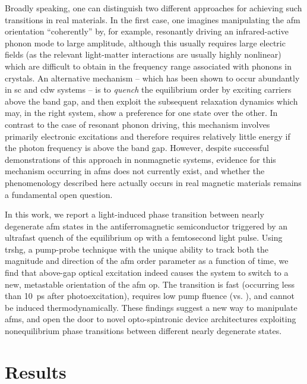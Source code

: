 Broadly speaking, one can distinguish two different approaches for achieving such transitions in real materials.
In the first case, one imagines manipulating the \gls{afm} orientation ``coherently'' by, for example, resonantly driving an infrared-active phonon mode to large amplitude, although this usually requires large electric fields (as the relevant light-matter interactions are usually highly nonlinear\citep{afanasiev_ultrafast_2021}) which are difficult to obtain in the frequency range associated with phonons in crystals.
An alternative mechanism -- which has been shown to occur abundantly in \gls{sc}\citep{fausti_light-induced_2011} and \gls{cdw}\citep{kogar_light-induced_2020} systems -- is to \textit{quench} the equilibrium order by exciting carriers above the band gap, and then exploit the subsequent relaxation dynamics which may, in the right system, show a preference for one state over the other\citep{sun_transient_2020}.
In contrast to the case of resonant phonon driving, this mechanism involves primarily electronic excitations and therefore requires relatively little energy if the photon frequency is above the band gap.
However, despite successful demonstrations of this approach in nonmagnetic systems\citep{fausti_light-induced_2011,kogar_light-induced_2020}, evidence for this mechanism occurring in \glspl{afm} does not currently exist, and whether the phenomenology described here actually occurs in real magnetic materials remains a fundamental open question.

In this work, we report a light-induced phase transition between nearly degenerate \gls{afm} states in the antiferromagnetic semiconductor \cmb \citep{gibson_magnetic_2015} triggered by an ultrafast quench of the equilibrium \gls{op} with a femtosecond light pulse.
Using \gls{trshg}, a pump-probe technique with the unique ability to track both the magnitude and direction of the \gls{afm} order parameter as a function of time, we find that above-gap optical excitation indeed causes the system to switch to a new, metastable orientation of the \gls{afm} \gls{op}.
The transition is fast (occurring less than \qty{10}{ps} after photoexcitation), requires low pump fluence (\threshold vs. \previousthreshold\citep{afanasiev_ultrafast_2021}), and cannot be induced thermodynamically.
These findings suggest a new way to manipulate \glspl{afm}, and open the door to novel opto-spintronic device architectures exploiting nonequilibrium phase transitions between different nearly degenerate states. 

\section{Results}

